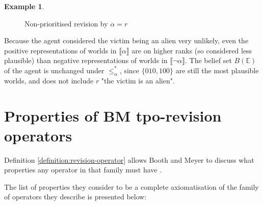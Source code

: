 \documentclass[english, 12pt]{scrartcl}
\theoremstyle{definition}
\newtheorem{example}{Example}
\theoremstyle{definition}
\theoremstyle{definition}
\newcommand{\modelsOf}[1]{\llbracket #1 \rrbracket}
\begin{document}
\begin{example}
\begin{figure}[H]
            \caption{Non-prioritised revision by $\alpha = r$}
            \label{fig:example-non-prio-revision}
    \end{figure}
    
    Because the agent considered the victim being an alien very unlikely, even the positive representations of worlds in $\modelsOf{\alpha}$ are on higher ranks (so considered less plausible) than negative representations of worlds in $\modelsOf{\neg\alpha}$.
    The belief set $B(\mathbb{E})$ of the agent is unchanged under $\leq_{\alpha}^{\ast}$, since $\{010, 100\}$ are still the most plausible worlds, and does not include $r$ "the victim is an alien".
\end{example}

\section{Properties of BM tpo-revision operators}
\label{section:properties-of-bm-tpo-revision-operators}
Definition \ref{definition:revision-operator} allows Booth and Meyer to discuss what properties any operator in that family must have \cite{Booth2011}.

The list of properties they consider to be a complete axiomatisation of the family of operators they describe is presented below:
\end{document}
